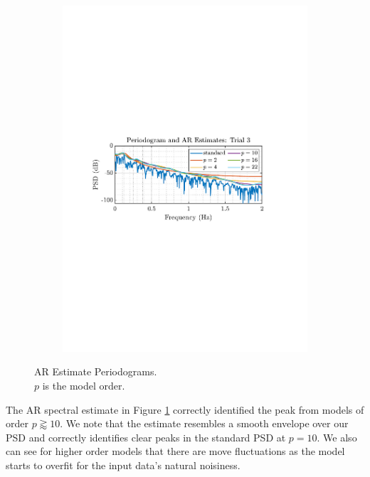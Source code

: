 \documentclass[12pt]{article}
\begin{document}
\begin{figure}[H]
			\hspace*{0.25\textwidth}
			\begin{subfigure}{0.49\textwidth}
				\includegraphics[trim={2.2cm 11.2cm 3.15cm  11.2cm}, clip, width=\textwidth]{../MATLAB/figures/q1_5c_fig03.pdf} 
			\end{subfigure}
			\captionsetup{justification=centering}
			\caption{AR Estimate Periodograms. \\ $p$ is the model order.}
			\label{fig: 1-5c}
		\end{figure}
	
		The AR spectral estimate in Figure \ref{fig: 1-5c} correctly identified the peak from models of order $p\gtrapprox10$. We note that the estimate resembles a smooth envelope over our PSD and correctly identifies clear peaks in the standard PSD at $p=10$. We also can see for higher order models that there are move fluctuations as the model starts to overfit for the input data's natural noisiness. \\
	
\end{document}
